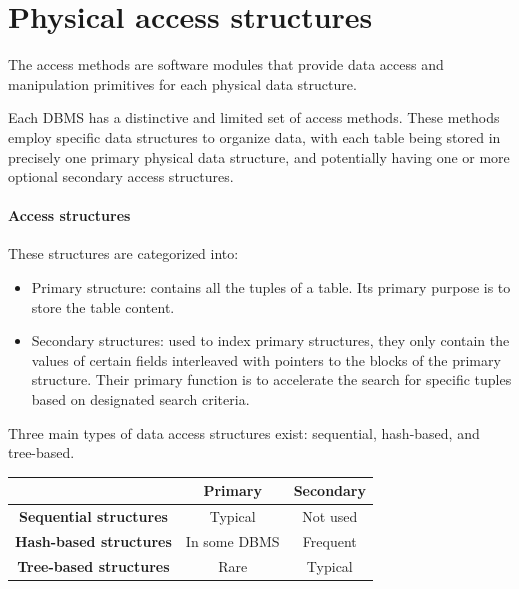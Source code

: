 \section{Physical access structures}

\begin{definition}
    The access methods are software modules that provide data access and manipulation primitives for each physical data structure. 
\end{definition}
Each DBMS has a distinctive and limited set of access methods. 
These methods employ specific data structures to organize data, with each table being stored in precisely one primary physical data structure, and potentially having one or more optional secondary access structures.

\paragraph*{Access structures}
These structures are categorized into: 
\begin{itemize}
    \item Primary structure: contains all the tuples of a table. 
        Its primary purpose is to store the table content. 
    \item Secondary structures: used to index primary structures, they only contain the values of certain fields interleaved with pointers to the blocks of the primary structure. 
    Their primary function is to accelerate the search for specific tuples based on designated search criteria.
\end{itemize}
Three main types of data access structures exist: sequential, hash-based, and tree-based.
\begin{table}[H]
    \centering
    \begin{tabular}{c|cc|}
    \cline{2-3}
                                                         & \textbf{Primary} & \textbf{Secondary} \\ \hline
    \multicolumn{1}{|c|}{\textbf{Sequential structures}} & Typical          & Not used           \\
    \multicolumn{1}{|c|}{\textbf{Hash-based structures}} & In some DBMS     & Frequent           \\
    \multicolumn{1}{|c|}{\textbf{Tree-based structures}} & Rare             & Typical            \\ \hline
    \end{tabular}
\end{table}

